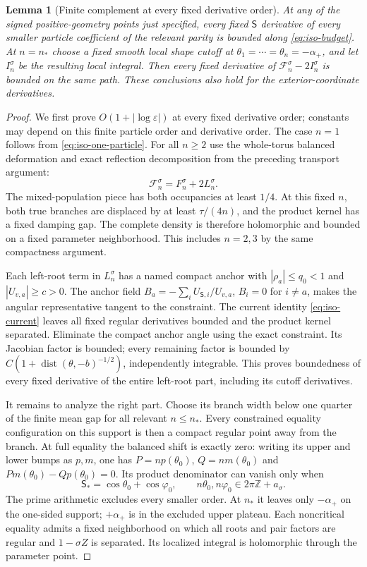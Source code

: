\documentclass[11pt]{article}
\numberwithin{equation}{section}
\newtheorem{lemma}[theorem]{Lemma}
\theoremstyle{definition}
\newcommand{\Z}{\mathbb Z}
\newcommand{\eps}{\varepsilon}
\newcommand{\dist}{\operatorname{dist}}
\begin{document}
\begin{lemma}[Finite complement at every fixed derivative order]
\label{lem:iso-finite-complement}
At any of the signed positive-geometry points just specified, every
fixed $\mathsf S$ derivative of every smaller particle coefficient of
the relevant parity is bounded along \eqref{eq:iso-budget}.
At $n=n_*$ choose a fixed smooth local shape cutoff at
$\theta_1=\cdots=\theta_n=-\alpha_+$, and let $I_n^\sigma$ be
the resulting local integral.  Then every fixed derivative of
$\mathcal F_n^\sigma-2I_n^\sigma$ is bounded on the same path.
These conclusions also hold for the exterior-coordinate derivatives.
\end{lemma}
\begin{proof}
We first prove $O(1+|\log\eps|)$ at every fixed derivative order;
constants may depend on this finite particle order and derivative
order.  The case $n=1$ follows from \eqref{eq:iso-one-particle}.
For all $n\ge2$ use the whole-torus balanced deformation and exact
reflection decomposition from the preceding transport argument:
\[
 \mathcal F_n^\sigma=F_n^\sigma+2L_n^\sigma.
\]
The mixed-population piece has both occupancies at least $1/4$.
At this fixed $n$, both true branches are displaced by at least
$\tau/(4n)$, and the product kernel has a fixed damping gap.
The complete density is therefore holomorphic and bounded on a
fixed parameter neighborhood.  This includes $n=2,3$ by the same compactness argument.

Each left-root term in $L_n^\sigma$ has a named compact anchor with
$|\rho_a|\le q_0<1$ and $|U_{v,a}|\ge c>0$.
The anchor field $B_a=-\sum_iU_{\mathsf S,i}/U_{v,a}$, $B_i=0$
for $i\ne a$, makes the angular representative tangent to the
constraint.  The current identity \eqref{eq:iso-current} leaves all
fixed regular derivatives bounded and the product kernel separated.
Eliminate the compact anchor angle using the exact constraint.
Its Jacobian factor is bounded; every remaining factor is bounded by
$C(1+\dist(\theta,-b)^{-1/2})$, independently integrable.
This proves boundedness of every fixed derivative of the entire
left-root part, including its cutoff derivatives.

It remains to analyze the right part.  Choose its branch width below
one quarter of the finite mean gap for all relevant $n\le n_*$.
Every constrained equality configuration on this support is then a
compact regular point away from the branch.
At full equality the balanced shift is exactly zero: writing its
upper and lower bumps as $p,m$, one has
$P=np(\theta_0)$, $Q=nm(\theta_0)$ and
$P m(\theta_0)-Q p(\theta_0)=0$.
Its product denominator can vanish only when
\[
 \mathsf S_* = \cos\theta_0+\cos\varphi_0,
 \qquad n\theta_0,n\varphi_0\in2\pi\Z+a_\sigma.
\]
The prime arithmetic excludes every smaller order.  At $n_*$ it
leaves only $-\alpha_+$ on the one-sided support; $+\alpha_+$ is
in the excluded upper plateau.  Each noncritical equality admits a
fixed neighborhood on which all roots and pair factors are regular
and $1-\sigma Z$ is separated.  Its localized integral is
holomorphic through the parameter point.


\end{proof}
\end{document}
